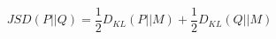 \begin{equation}
    JSD(P || Q) = \frac{1}{2} D_{KL}(P || M) + \frac{1}{2} D_{KL}(Q || M)
    \label{eq:jsd}
\end{equation}